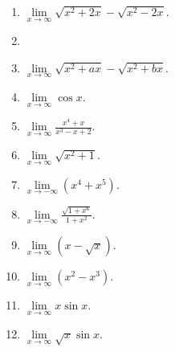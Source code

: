 \begin{multicols}{3}
\begin{enumerate}[ref={\fcProblemRef}]
\item $\lim\limits_{x \to\infty}\sqrt{x^2+2x}- \sqrt{ x^2 -2x} $. 

\item 
\item $\displaystyle \lim\limits_{x\to \infty}\sqrt{ x^2+ax}- \sqrt{x^2+bx}$.

\item $\displaystyle \lim\limits_{x\to\infty}\cos x$.

\item $\displaystyle \lim\limits_{x\to\infty}\frac{x^4+x}{x^3-x+2}$.

\answer{$\infty$}
\item $\displaystyle \lim\limits_{x\to\infty}\sqrt{x^2+1}$.

\answer{$\infty$}
\item $\displaystyle \lim\limits_{x\to-\infty}(x^4+x^5)$.

\answer{$-\infty$}
\item $\displaystyle \lim\limits_{x\to-\infty}\frac{\sqrt{1+x^6}}{1+x^2}$.

\answer{$\infty$}
\item $\displaystyle \lim\limits_{x\to\infty}(x-\sqrt{x})$.

\answer{$\infty$}
\item $\displaystyle \lim\limits_{x\to\infty}(x^2-x^3)$.

\answer{$-\infty$}
\item $\displaystyle \lim\limits_{x\to\infty}x\sin x$.

\item $\displaystyle \lim\limits_{x\to\infty}\sqrt{x}\sin x$.

\end{enumerate}
\end{multicols}